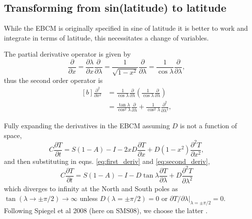 \documentclass[12pt, onecolumn]{revtex4-2}    %
\begin{document}
\subsection{Transforming from sin(latitude) to latitude} \label{ssec:transxlambda}

While the EBCM is originally specified in sine of latitude it is better to work and integrate in terms of latitude, this necessitates a change of variables.

The partial derivative operator is given by
\begin{equation}
    \frac{\partial}{\partial x} = \frac{\partial \lambda}{\partial x} \frac {\partial} {\partial \lambda}
    = \frac{1}{\sqrt{1-x^2}} \frac {\partial} {\partial \lambda}
    = \frac{1}{\cos \lambda} \frac {\partial} {\partial \lambda},
    \label{eq:first_deriv}
\end{equation}
thus the second order operator is
\begin{equation}
    \begin{aligned}[b]
        \frac{\partial^2}{\partial x^2} & = \frac{1}{\cos\lambda} \frac{\partial}{\partial \lambda} \left( \frac{1}{\cos\lambda} \frac{\partial}{\partial \lambda} \right)      \\
                                        & = \frac{\tan\lambda}{\cos^2\lambda}\frac{\partial}{\partial \lambda} + \frac{1}{\cos^2\lambda} \frac{\partial^2}{\partial \lambda^2},
    \end{aligned}
    \label{eq:second_deriv}
\end{equation}

Fully expanding the derivatives in the EBCM assuming $D$ is not a function of space,
\begin{equation}
    C \frac{\partial T}{\partial t} = S(1-A) - I
    - 2 x D \frac{\partial T}{\partial x}
    + D (1-x^2) \frac{\partial^2 T}{\partial x^2},
    \label{eq:expanded}
\end{equation}
and then substituting in eqns. \eqref{eq:first_deriv} and \eqref{eq:second_deriv},
\begin{equation}
    C \frac{\partial T}{\partial t} = S(1-A) - I
    - D \tan\lambda \frac{\partial T}{\partial \lambda}
    + D \frac{\partial^2 T}{\partial \lambda^2}
    \label{eq:PDE_in_lat}
\end{equation}
which diverges to infinity at the North and South poles as $\tan(\lambda \rightarrow \pm \pi/2) \rightarrow \infty$ unless $D(\lambda = \pm \pi/2) = 0$ or $\partial T / \partial \lambda|_{\lambda=\pm \pi/2} = 0$.
Following Spiegel et al 2008 (here on SMS08), we choose the latter \cite{SMS08}.
\end{document}
